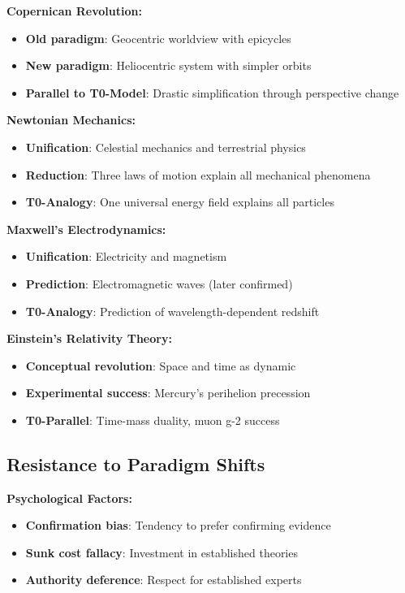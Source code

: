 \documentclass[12pt,a4paper]{report}
\begin{document}
\textbf{Copernican Revolution:}
\begin{itemize}
	\item \textbf{Old paradigm}: Geocentric worldview with epicycles
	\item \textbf{New paradigm}: Heliocentric system with simpler orbits
	\item \textbf{Parallel to T0-Model}: Drastic simplification through perspective change
\end{itemize}

\textbf{Newtonian Mechanics:}
\begin{itemize}
	\item \textbf{Unification}: Celestial mechanics and terrestrial physics
	\item \textbf{Reduction}: Three laws of motion explain all mechanical phenomena
	\item \textbf{T0-Analogy}: One universal energy field explains all particles
\end{itemize}

\textbf{Maxwell's Electrodynamics:}
\begin{itemize}
	\item \textbf{Unification}: Electricity and magnetism
	\item \textbf{Prediction}: Electromagnetic waves (later confirmed)
	\item \textbf{T0-Analogy}: Prediction of wavelength-dependent redshift
\end{itemize}

\textbf{Einstein's Relativity Theory:}
\begin{itemize}
	\item \textbf{Conceptual revolution}: Space and time as dynamic
	\item \textbf{Experimental success}: Mercury's perihelion precession
	\item \textbf{T0-Parallel}: Time-mass duality, muon g-2 success
\end{itemize}

\subsection{Resistance to Paradigm Shifts}\label{subsec:resistance_paradigm_shifts}

\textbf{Psychological Factors:}
\begin{itemize}
	\item \textbf{Confirmation bias}: Tendency to prefer confirming evidence
	\item \textbf{Sunk cost fallacy}: Investment in established theories
	\item \textbf{Authority deference}: Respect for established experts
\end{itemize}
\end{document}
